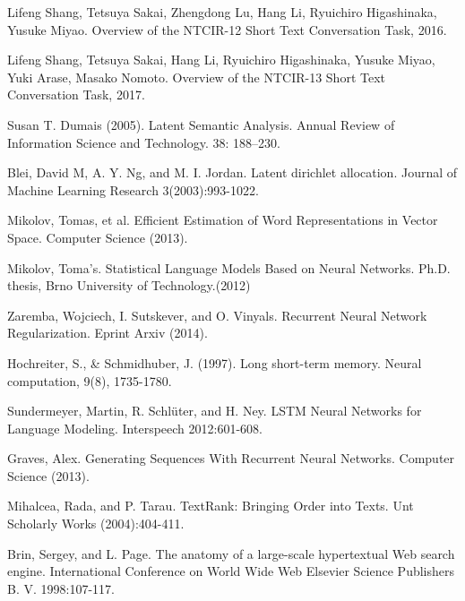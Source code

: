 \documentclass{sig-alternate}
\begin{document}
%
%
\begin{thebibliography}{5}

Lifeng Shang, Tetsuya Sakai, Zhengdong Lu, Hang Li, Ryuichiro Higashinaka, Yusuke Miyao. 
Overview of the NTCIR-12 Short Text Conversation Task, 2016.

Lifeng Shang, Tetsuya Sakai, Hang Li, Ryuichiro Higashinaka, Yusuke Miyao, Yuki Arase, Masako Nomoto. 
Overview of the NTCIR-13 Short Text Conversation Task, 2017.

Susan T. Dumais (2005). Latent Semantic Analysis. Annual Review of Information Science and Technology. 38: 188–230. 

Blei, David M, A. Y. Ng, and M. I. Jordan. Latent dirichlet allocation. Journal of Machine Learning Research 3(2003):993-1022.

Mikolov, Tomas, et al. Efficient Estimation of Word Representations in Vector Space. Computer Science (2013).

Mikolov, Toma's. Statistical Language Models Based on Neural Networks. Ph.D. thesis, Brno University of Technology.(2012)

Zaremba, Wojciech, I. Sutskever, and O. Vinyals. Recurrent Neural Network Regularization. Eprint Arxiv (2014).

Hochreiter, S., \& Schmidhuber, J. (1997). Long short-term memory. Neural computation, 9(8), 1735-1780.

Sundermeyer, Martin, R. Schlüter, and H. Ney. LSTM Neural Networks for Language Modeling. Interspeech 2012:601-608.

Graves, Alex. Generating Sequences With Recurrent Neural Networks. Computer Science (2013).

Mihalcea, Rada, and P. Tarau. TextRank: Bringing Order into Texts. Unt Scholarly Works (2004):404-411.

Brin, Sergey, and L. Page. The anatomy of a large-scale hypertextual Web search engine. International Conference on World Wide Web Elsevier Science Publishers B. V. 1998:107-117.


\end{thebibliography}
\end{document}
